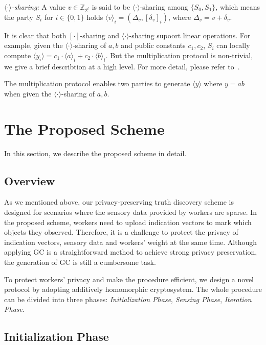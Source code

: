 \documentclass[conference]{IEEEtran}
\begin{document}
\textit{$\langle \cdot \rangle$-sharing:} A value $v\in\mathbb{Z}_{2^\ell}$ is said to be $\langle \cdot \rangle$-sharing among $\{S_0, S_1\}$, which means the party $S_i$ for $i\in\{0,1\}$ holds $\langle v \rangle_i = (\Delta_v, [\delta_v]_i)$, where $\Delta_v = v + \delta_v$.

It is clear that both $[\cdot]$-sharing and $\langle \cdot \rangle$-sharing supoort linear operations.
For example, given the $\langle \cdot \rangle$-sharing of $a,b$ and public constants $c_1,c_2$, $S_i$ can locally compute $\langle y_i \rangle = c_1 \cdot \langle a \rangle_i + c_2 \cdot \langle b \rangle_i$.
But the multiplication protocol is non-trivial, we give a brief describtion at a high level.
For more detail, please refer to~\cite{patra_aby20_2020}.

The multiplication protocol enables two parties to generate $\langle y \rangle$ where $y = ab$ when given the $\langle \cdot \rangle$-sharing of $a,b$.
\fi


\section{The Proposed Scheme}\label{sec5}

In this section, we describe the proposed scheme in detail.

\subsection{Overview}

As we mentioned above, our privacy-preserving truth discovery scheme is designed for scenarios where the sensory data provided by workers are sparse.
In the proposed scheme, workers need to upload indication vectors to mark which objects they observed.
Therefore, it is a challenge to protect the privacy of indication vectors, sensory data and workers' weight at the same time.
Although applying GC is a straightforward method to achieve strong privacy preservation, the generation of GC is still a cumbersome task.

To protect workers' privacy and make the procedure efficient, we design a novel protocol by adopting additively homomorphic cryptosystem.
The whole procedure can be divided into three phases: {\em Initialization Phase}, {\em Sensing Phase}, {\em Iteration Phase}.

\subsection{Initialization Phase}
\end{document}
